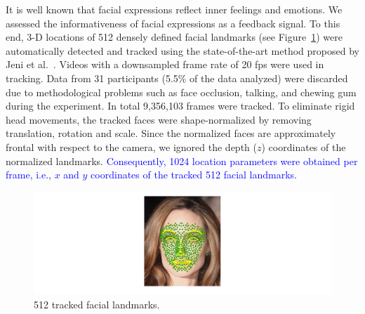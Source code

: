 It is well known that facial expressions reflect inner feelings
and emotions. We assessed the informativeness of facial
expressions as a feedback signal. To this end, 3-D locations of 512
densely defined facial landmarks (see
Figure~\ref{landmarks}) were automatically detected and
tracked using the state-of-the-art method proposed by Jeni et
al.\ \cite{jeni2015dense}. Videos with a downsampled frame
rate of 20 fps were used in tracking. Data from 31 participants (5.5\% of the data analyzed) %
were discarded due to methodological problems such as face
occlusion, talking, and chewing gum during the experiment. %
In
total 9,356,103 frames were tracked.  %
To eliminate rigid head movements, the tracked faces were
shape-normalized by removing translation, rotation and scale.
Since the normalized faces are approximately frontal with
respect to the camera, we ignored the depth ($z$) coordinates
of the normalized landmarks. \textcolor{blue}{Consequently, 1024 location
parameters were obtained per frame, i.e., $x$ and $y$ coordinates of the tracked 512 facial landmarks.} %

\begin{figure}[htb]
\centering
\includegraphics[height=0.35\columnwidth]{markers2.pdf}
\caption{512 tracked facial landmarks.}
\label{landmarks}
\end{figure}


